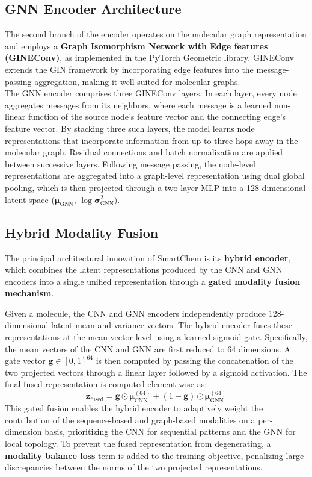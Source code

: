 \documentclass[12pt,a4paper]{report}
\begin{document}
\subsection{GNN Encoder Architecture}

The second branch of the encoder operates on the molecular graph representation and employs a \textbf{Graph Isomorphism Network with Edge features (GINEConv)}, as implemented in the PyTorch Geometric library. GINEConv extends the GIN framework by incorporating edge features into the message-passing aggregation, making it well-suited for molecular graphs.\\

The GNN encoder comprises three GINEConv layers. In each layer, every node aggregates messages from its neighbors, where each message is a learned non-linear function of the source node's feature vector and the connecting edge's feature vector. By stacking three such layers, the model learns node representations that incorporate information from up to three hops away in the molecular graph. Residual connections and batch normalization are applied between successive layers. Following message passing, the node-level representations are aggregated into a graph-level representation using dual global pooling, which is then projected through a two-layer MLP into a 128-dimensional latent space ($\boldsymbol{\mu}_{\text{GNN}}$, $\log \boldsymbol{\sigma}^2_{\text{GNN}}$).

\subsection{Hybrid Modality Fusion}

The principal architectural innovation of SmartChem is its \textbf{hybrid encoder}, which combines the latent representations produced by the CNN and GNN encoders into a single unified representation through a \textbf{gated modality fusion mechanism}.

Given a molecule, the CNN and GNN encoders independently produce 128-dimensional latent mean and variance vectors. The hybrid encoder fuses these representations at the mean-vector level using a learned sigmoid gate. Specifically, the mean vectors of the CNN and GNN are first reduced to 64 dimensions. A gate vector $\mathbf{g} \in [0,1]^{64}$ is then computed by passing the concatenation of the two projected vectors through a linear layer followed by a sigmoid activation. The final fused representation is computed element-wise as:
\[
    \mathbf{z}_{\text{fused}} = \mathbf{g} \odot \boldsymbol{\mu}_{\text{CNN}}^{(64)} + (1 - \mathbf{g}) \odot \boldsymbol{\mu}_{\text{GNN}}^{(64)}
\]
This gated fusion enables the hybrid encoder to adaptively weight the contribution of the sequence-based and graph-based modalities on a per-dimension basis, prioritizing the CNN for sequential patterns and the GNN for local topology. To prevent the fused representation from degenerating, a \textbf{modality balance loss} term is added to the training objective, penalizing large discrepancies between the norms of the two projected representations.
\end{document}
